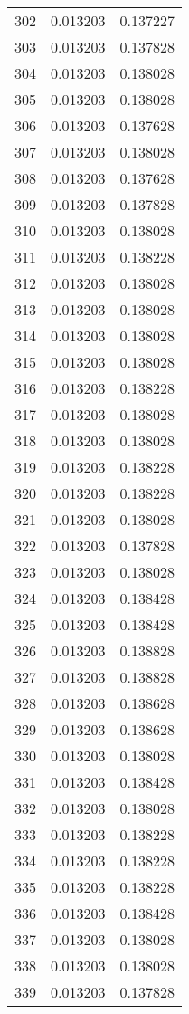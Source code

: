 \begin{longtable}{rrr}
302 & 0.013203 & 0.137227 \\
303 & 0.013203 & 0.137828 \\
304 & 0.013203 & 0.138028 \\
305 & 0.013203 & 0.138028 \\
306 & 0.013203 & 0.137628 \\
307 & 0.013203 & 0.138028 \\
308 & 0.013203 & 0.137628 \\
309 & 0.013203 & 0.137828 \\
310 & 0.013203 & 0.138028 \\
311 & 0.013203 & 0.138228 \\
312 & 0.013203 & 0.138028 \\
313 & 0.013203 & 0.138028 \\
314 & 0.013203 & 0.138028 \\
315 & 0.013203 & 0.138028 \\
316 & 0.013203 & 0.138228 \\
317 & 0.013203 & 0.138028 \\
318 & 0.013203 & 0.138028 \\
319 & 0.013203 & 0.138228 \\
320 & 0.013203 & 0.138228 \\
321 & 0.013203 & 0.138028 \\
322 & 0.013203 & 0.137828 \\
323 & 0.013203 & 0.138028 \\
324 & 0.013203 & 0.138428 \\
325 & 0.013203 & 0.138428 \\
326 & 0.013203 & 0.138828 \\
327 & 0.013203 & 0.138828 \\
328 & 0.013203 & 0.138628 \\
329 & 0.013203 & 0.138628 \\
330 & 0.013203 & 0.138028 \\
331 & 0.013203 & 0.138428 \\
332 & 0.013203 & 0.138028 \\
333 & 0.013203 & 0.138228 \\
334 & 0.013203 & 0.138228 \\
335 & 0.013203 & 0.138228 \\
336 & 0.013203 & 0.138428 \\
337 & 0.013203 & 0.138028 \\
338 & 0.013203 & 0.138028 \\
339 & 0.013203 & 0.137828 \\

\end{longtable}
